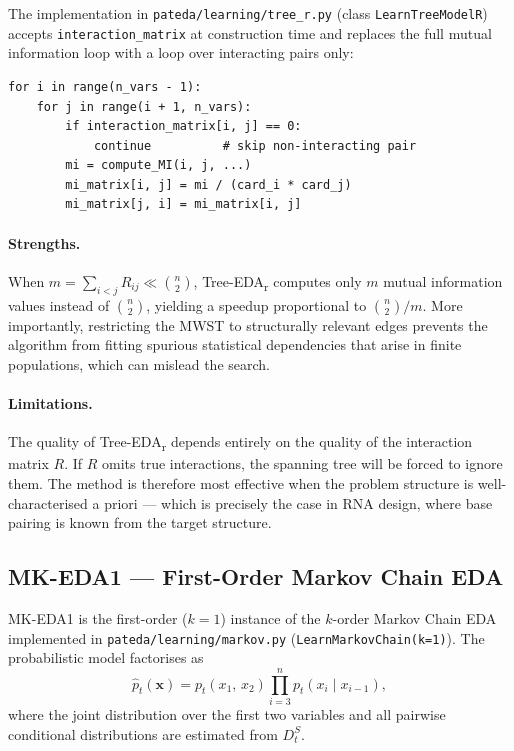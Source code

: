 \documentclass[11pt,a4paper]{article}
\begin{document}
The implementation in \texttt{pateda/learning/tree\_r.py} (class
\texttt{LearnTreeModelR}) accepts \texttt{interaction\_matrix} at
construction time and replaces the full mutual information loop with a loop
over interacting pairs only:

\begin{center}
\begin{minipage}{0.85\textwidth}
\begin{verbatim}
for i in range(n_vars - 1):
    for j in range(i + 1, n_vars):
        if interaction_matrix[i, j] == 0:
            continue          # skip non-interacting pair
        mi = compute_MI(i, j, ...)
        mi_matrix[i, j] = mi / (card_i * card_j)
        mi_matrix[j, i] = mi_matrix[i, j]
\end{verbatim}
\end{minipage}
\end{center}

\paragraph{Strengths.} When $m = \sum_{i<j} R_{ij} \ll \binom{n}{2}$,
Tree-EDA\textsubscript{r} computes only $m$ mutual information values instead
of $\binom{n}{2}$, yielding a speedup proportional to $\binom{n}{2}/m$.
More importantly, restricting the MWST to structurally relevant edges
prevents the algorithm from fitting spurious statistical dependencies that
arise in finite populations, which can mislead the search.

\paragraph{Limitations.} The quality of Tree-EDA\textsubscript{r} depends
entirely on the quality of the interaction matrix $R$. If $R$ omits true
interactions, the spanning tree will be forced to ignore them. The method is
therefore most effective when the problem structure is well-characterised a
priori — which is precisely the case in RNA design, where base pairing is
known from the target structure.

\subsection{MK-EDA1 — First-Order Markov Chain EDA}

MK-EDA1 is the first-order ($k=1$) instance of the $k$-order Markov Chain
EDA~\cite{santana2008protein} implemented in
\texttt{pateda/learning/markov.py} (\texttt{LearnMarkovChain(k=1)}). The
probabilistic model factorises as
\[
  \hat{p}_t(\mathbf{x})
  = p_t(x_1,\, x_2)
    \prod_{i=3}^{n} p_t(x_i \mid x_{i-1}),
\]
where the joint distribution over the first two variables and all pairwise
conditional distributions are estimated from $D_t^S$.
\end{document}
